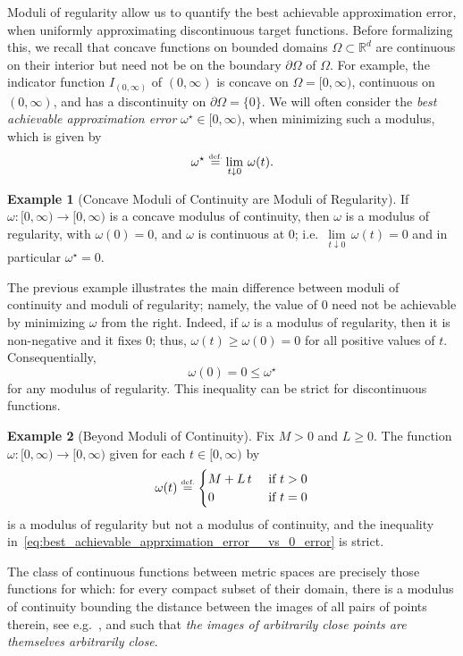\documentclass{article}
\numberwithin{equation}{section}
\theoremstyle{definition}
\newtheorem{example}{Example}[section]
\newcommand{\eqdef}{\ensuremath{\stackrel{\mbox{\upshape\tiny def.}}{=}}}
\begin{document}
Moduli of regularity allow us to quantify the best achievable approximation error, when uniformly approximating discontinuous target functions.  
Before formalizing this, we recall that concave functions on bounded domains $\Omega\subset \mathbb{R}^d$ are continuous on their interior but need not be on the boundary $\partial \Omega$ of $\Omega$.  For example, the indicator function $I_{(0,\infty)}$ of $(0,\infty)$ is concave on $\Omega = [0,\infty)$, continuous on $(0,\infty)$, and has a discontinuity on $\partial \Omega =\{0\}$.
We will often consider the \textit{best achievable approximation error} $\omega^{\star}\in [0,\infty)$, when minimizing such a modulus, which is given by
\[
    \omega^{\star} \eqdef \lim\limits_{t\downarrow 0}\, \omega(t) 
.
\]
\begin{example}[Concave Moduli of Continuity are Moduli of Regularity]
\label{ex:mod_continuity}
If $\omega:[0,\infty)\to[0,\infty)$ is a concave modulus of continuity, then $\omega$ is a modulus of regularity, with $\omega(0)=0$, and $\omega$ is continuous at $0$; i.e.\ $\lim\limits_{t\downarrow 0}\,\omega(t)=0$ and in particular $\omega^{\star}=0$.
\end{example}
The previous example illustrates the main difference between moduli of continuity and moduli of regularity; namely, the value of $0$ need not be achievable by minimizing $\omega$ from the right.  Indeed, if $\omega$ is a modulus of regularity, then it is non-negative and it fixes $0$; thus, $\omega(t) \ge \omega(0)=0$ for all positive values of $t$.  Consequentially, 
\begin{equation}
\label{eq:best_achievable_apprximation_error__vs_0_error}
        \omega(0)
    =
        0
    \le 
        \omega^{\star} 
\end{equation}
for any modulus of regularity.  This inequality can be strict for discontinuous functions.
\begin{example}[Beyond Moduli of Continuity]
\label{ex:modulus_of_heavyside_function}
Fix $M>0$ and $L\ge 0$.  
The function $\omega:[0,\infty)\to [0,\infty)$ given for each $t\in [0,\infty)$ by
\[
    \omega(t)
    \eqdef 
    \begin{cases}
        M+ L\,t & \mbox{ if }  t>0 \\
        0 & \mbox{ if } t=0
    \end{cases}
\]
is a modulus of regularity but not a modulus of continuity, and the inequality in~\eqref{eq:best_achievable_apprximation_error__vs_0_error} is strict.
\end{example}
The class of continuous functions between metric spaces are precisely those functions for which: for every compact subset of their domain, there is a modulus of continuity bounding the distance between the images of all pairs of points therein, see e.g.~\citep[Theorem 27.6]{MunkresTopBook}, and such that \textit{the images of arbitrarily close points are themselves arbitrarily close}.   
\end{document}
